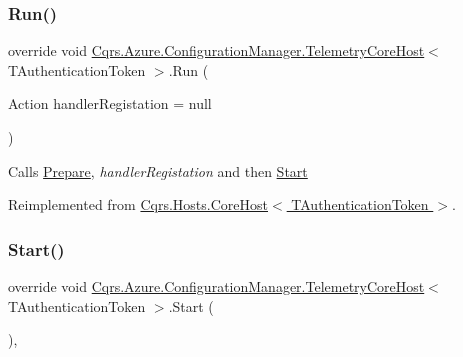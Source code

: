 \subsubsection{\texorpdfstring{Run()}{Run()}}
{\footnotesize\ttfamily override void \hyperlink{classCqrs_1_1Azure_1_1ConfigurationManager_1_1TelemetryCoreHost}{Cqrs.\+Azure.\+Configuration\+Manager.\+Telemetry\+Core\+Host}$<$ T\+Authentication\+Token $>$.Run (\begin{DoxyParamCaption}\item[{Action}]{handler\+Registation = {\ttfamily null} }\end{DoxyParamCaption})\hspace{0.3cm}{\ttfamily [virtual]}}



Calls \hyperlink{classCqrs_1_1Azure_1_1ConfigurationManager_1_1TelemetryCoreHost_a620cb9c1ceb78a8f23b45ae749199fd4_a620cb9c1ceb78a8f23b45ae749199fd4}{Prepare}, {\itshape handler\+Registation}  and then \hyperlink{classCqrs_1_1Azure_1_1ConfigurationManager_1_1TelemetryCoreHost_a37c8e3f829743d6be1108b3fd8a5a3e7_a37c8e3f829743d6be1108b3fd8a5a3e7}{Start} 



Reimplemented from \hyperlink{classCqrs_1_1Hosts_1_1CoreHost_a118553f5aa11e7fe07fce1d899528fa6_a118553f5aa11e7fe07fce1d899528fa6}{Cqrs.\+Hosts.\+Core\+Host$<$ T\+Authentication\+Token $>$}.

\mbox{\label{classCqrs_1_1Azure_1_1ConfigurationManager_1_1TelemetryCoreHost_a37c8e3f829743d6be1108b3fd8a5a3e7_a37c8e3f829743d6be1108b3fd8a5a3e7}} 
\subsubsection{\texorpdfstring{Start()}{Start()}}
{\footnotesize\ttfamily override void \hyperlink{classCqrs_1_1Azure_1_1ConfigurationManager_1_1TelemetryCoreHost}{Cqrs.\+Azure.\+Configuration\+Manager.\+Telemetry\+Core\+Host}$<$ T\+Authentication\+Token $>$.Start (\begin{DoxyParamCaption}{ }\end{DoxyParamCaption})\hspace{0.3cm}{\ttfamily [protected]}, {\ttfamily [virtual]}}




